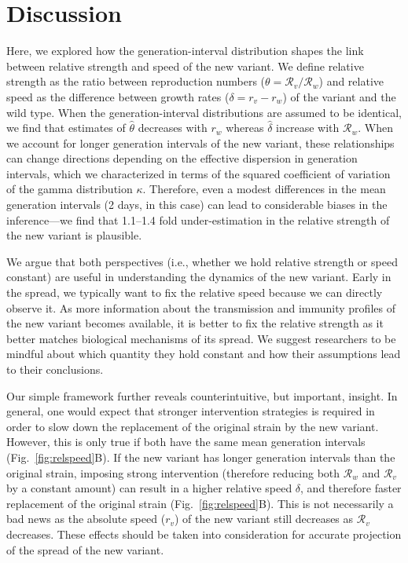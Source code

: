 \documentclass[12pt]{article}
\newcommand{\fref}[1]{Fig.~\ref{fig:#1}}
\newcommand{\RR}{\ensuremath{{\mathcal R}}\xspace}
\begin{document}
\section{Discussion}

Here, we explored how the generation-interval distribution shapes the link between relative strength and speed of the new variant.
We define relative strength as the ratio between reproduction numbers ($\theta=\RR_v/\RR_w$) and relative speed as the difference between growth rates ($\delta=r_v-r_w$) of the variant and the wild type.
When the generation-interval distributions are assumed to be identical, we find that estimates of $\hat{\theta}$ decreases with $r_w$ whereas $\hat{\delta}$ increase with $\RR_w$.
When we account for longer generation intervals of the new variant, these relationships can change directions depending on the effective dispersion in generation intervals, which we characterized in terms of the squared coefficient of variation of the gamma distribution $\kappa$.
Therefore, even a modest differences in the mean generation intervals (2 days, in this case) can lead to considerable biases in the inference---we find that 1.1--1.4 fold under-estimation in the relative strength of the new variant is plausible.

We argue that both perspectives (i.e., whether we hold relative strength or speed constant) are useful in understanding the dynamics of the new variant.
Early in the spread, we typically want to fix the relative speed because we can directly observe it.
As more information about the transmission and immunity profiles of the new variant becomes available, it is better to fix the relative strength as it better matches biological mechanisms of its spread.
We suggest researchers to be mindful about which quantity they hold constant and how their assumptions lead to their conclusions.

Our simple framework further reveals counterintuitive, but important, insight.
In general, one would expect that stronger intervention strategies is required in order to slow down the replacement of the original strain by the new variant.
However, this is only true if both have the same mean generation intervals (\fref{relspeed}B).
If the new variant has longer generation intervals than the original strain, imposing strong intervention (therefore reducing both $\RR_w$ and $\RR_v$ by a constant amount) can result in a higher relative speed $\delta$, and therefore faster replacement of the original strain (\fref{relspeed}B).
This is not necessarily a bad news as the absolute speed ($r_v$) of the new variant still decreases as $\RR_v$ decreases.
These effects should be taken into consideration for accurate projection of the spread of the new variant.
\end{document}
